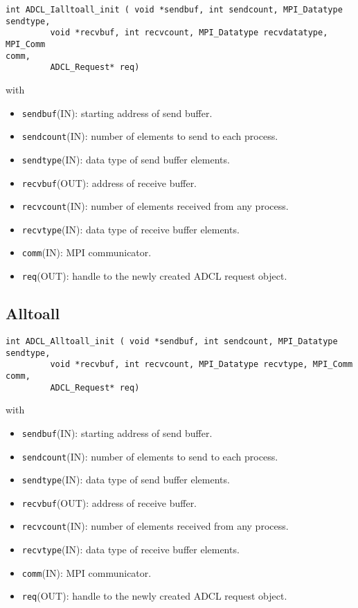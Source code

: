 \begin{verbatim}
int ADCL_Ialltoall_init ( void *sendbuf, int sendcount, MPI_Datatype sendtype,
         void *recvbuf, int recvcount, MPI_Datatype recvdatatype, MPI_Comm
comm,
         ADCL_Request* req)
\end{verbatim}
with
\begin{itemize}
\item {\tt sendbuf}(IN): starting address of send buffer.
\item {\tt sendcount}(IN): number of elements to send to each process.
\item {\tt sendtype}(IN): data type of send buffer elements.
\item {\tt recvbuf}(OUT): address of receive buffer.
\item {\tt recvcount}(IN): number of elements received from any process.
\item {\tt recvtype}(IN): data type of receive buffer elements.
\item {\tt comm}(IN): MPI communicator.
\item {\tt req}(OUT): handle to the newly created ADCL request object.
\end{itemize}

\subsection{Alltoall}

\begin{verbatim}
int ADCL_Alltoall_init ( void *sendbuf, int sendcount, MPI_Datatype sendtype,
         void *recvbuf, int recvcount, MPI_Datatype recvtype, MPI_Comm comm,
         ADCL_Request* req)
\end{verbatim}
with
\begin{itemize}
\item {\tt sendbuf}(IN): starting address of send buffer.
\item {\tt sendcount}(IN): number of elements to send to each process.
\item {\tt sendtype}(IN): data type of send buffer elements.
\item {\tt recvbuf}(OUT): address of receive buffer.
\item {\tt recvcount}(IN): number of elements received from any process.
\item {\tt recvtype}(IN): data type of receive buffer elements.
\item {\tt comm}(IN): MPI communicator.
\item {\tt req}(OUT): handle to the newly created ADCL request object.
\end{itemize}


